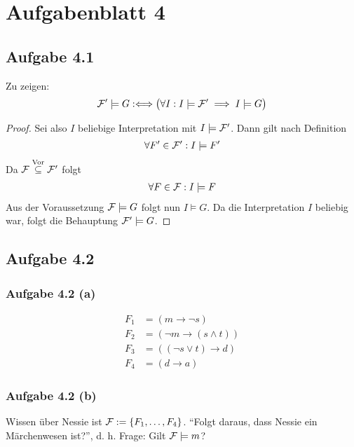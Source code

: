 
\section{Aufgabenblatt 4}
\subsection{Aufgabe 4.1}
Zu zeigen:
\begin{align*}
	\mathcal{F}'\models G:\Longleftrightarrow\big(\forall I:I\models\mathcal{F}'\implies I\models G\big)
\end{align*}

\begin{proof}
	Sei also $I$ beliebige Interpretation mit $I\models\mathcal{F}'$. 
	Dann gilt nach Definition
	\begin{align*}
		\forall F'\in\mathcal{F}':I\models F'
	\end{align*}
	Da $\mathcal{F}\stackrel{\text{Vor}}{\subseteq}\mathcal{F}'$ folgt 
	\begin{align*}
		\forall F\in\mathcal{F}:I\models F
	\end{align*}
	Aus der Voraussetzung $\mathcal{F}\models G$ folgt nun $I\models G$. 
	Da die Interpretation $I$ beliebig war, folgt die Behauptung $\mathcal{F}'\models G$. 
\end{proof}

\subsection{Aufgabe 4.2}
\subsubsection{Aufgabe 4.2 (a)}
\begin{align*}
	F_1 &=(m \to\neg s)\\
	F_2 &=(\neg m\to (s\wedge t))\\
	F_3&=((\neg s\vee t)\to d)\\
	F_4&=(d\to a)
\end{align*}

\subsubsection{Aufgabe 4.2 (b)}
Wissen über Nessie ist $\mathcal{F}:=\lbrace F_1,\ldots, F_4\rbrace$.
``Folgt daraus, dass Nessie ein Märchenwesen ist?'', d. h.
Frage: Gilt $\mathcal{F}\models m$?

